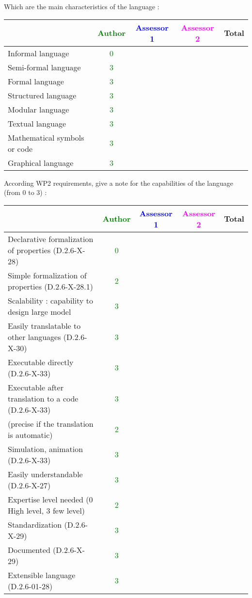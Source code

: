 Which are the main characteristics of the language :

\begin{tabular}{|l | c | c | c | c|}
\hline
& \textcolor{green}{Author} & \textcolor{blue}{Assessor 1} & \textcolor{magenta}{Assessor 2} & Total \\
\hline 
Informal language & \textcolor{green}{0} & & &  \\
\hline 
Semi-formal language & \textcolor{green}{3} & & &  \\
\hline
Formal language & \textcolor{green}{3} & & &  \\
\hline
Structured language & \textcolor{green}{3} & & & \\
\hline
Modular language & \textcolor{green}{3} & & & \\
\hline
Textual language & \textcolor{green}{3} & & & \\
\hline
Mathematical symbols or code & \textcolor{green}{3} & & & \\
\hline
Graphical language & \textcolor{green}{3} & & & \\
\hline
\end{tabular}

According WP2 requirements, give a note for the capabilities of the language (from 0 to 3) :

\begin{tabular}{|l | c | c | c | c|}
\hline
& \textcolor{green}{Author} & \textcolor{blue}{Assessor 1} & \textcolor{magenta}{Assessor 2} & Total \\
\hline
Declarative formalization of properties (D.2.6-X-28) & \textcolor{green}{0} & & & \\
\hline
Simple formalization of properties (D.2.6-X-28.1) & \textcolor{green}{2} & & & \\
\hline
Scalability : capability to design large model & \textcolor{green}{3} & & & \\
\hline
Easily translatable to other languages (D.2.6-X-30) & \textcolor{green}{3} & & & \\
\hline
Executable directly (D.2.6-X-33) & \textcolor{green}{3} & & & \\
\hline
Executable after translation to a code (D.2.6-X-33) & \textcolor{green}{3} & & & \\
(precise if the translation is automatic) & \textcolor{green}{2} & & & \\
\hline
Simulation, animation (D.2.6-X-33) & \textcolor{green}{3} & & & \\
\hline
Easily understandable (D.2.6-X-27) & \textcolor{green}{3} & & & \\
\hline
Expertise level needed (0 High level, 3 few level) & \textcolor{green}{2} & & & \\
\hline
Standardization (D.2.6-X-29) & \textcolor{green}{3} & & & \\
\hline
Documented (D.2.6-X-29) & \textcolor{green}{3} & & & \\
\hline
Extensible language (D.2.6-01-28) & \textcolor{green}{3} & & & \\
\hline
\end{tabular}


